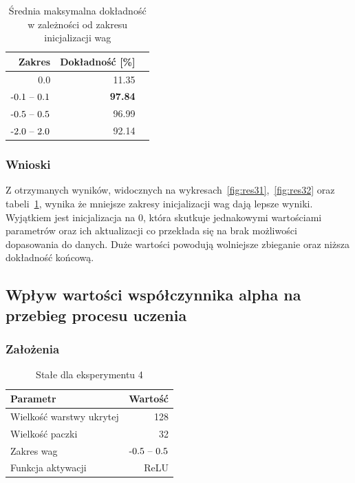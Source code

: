 \documentclass{article}
\begin{document}
\begin{table}[H]
	\caption{Średnia maksymalna dokładność w zależności od zakresu inicjalizacji wag}
	\label{tabela-res-31}
	\centering
	\begin{tabular}{rrr}
		\toprule
		Zakres            & Dokładność [\%] \\
		\midrule
		0.0               & 11.35              \\
		\($-0.1 -- 0.1$\) & \textbf{97.84}     \\
		\($-0.5 -- 0.5$\) & 96.99              \\
		\($-2.0 -- 2.0$\) & 92.14              \\
		\bottomrule
	\end{tabular}
\end{table}

\subsubsection*{Wnioski}

Z otrzymanych wyników, widocznych na wykresach~\ref{fig:res31},~\ref{fig:res32} oraz tabeli~\ref{tabela-res-31}, wynika że mniejsze zakresy inicjalizacji wag dają lepsze wyniki. Wyjątkiem jest inicjalizacja na 0, która skutkuje jednakowymi wartościami parametrów oraz ich aktualizacji co przekłada się na brak możliwości dopasowania do danych. Duże wartości powodują wolniejsze zbieganie oraz niższa dokładność końcową.

\newpage
\subsection{Wpływ wartości współczynnika alpha na przebieg procesu uczenia}
\subsubsection*{Założenia}
\begin{table}[H]
	\caption{Stałe dla eksperymentu 4}
	\label{tabela-const-4}
	\centering
	\begin{tabular}{lr}
		\toprule
		Parametr                   & Wartość         \\
		\midrule
		Wielkość warstwy ukrytej & 128               \\
		Wielkość paczki          & 32                \\
		Zakres wag                 & \($-0.5 -- 0.5$\) \\
		Funkcja aktywacji          & ReLU              \\
		\bottomrule
	\end{tabular}
\end{table}
\end{document}
